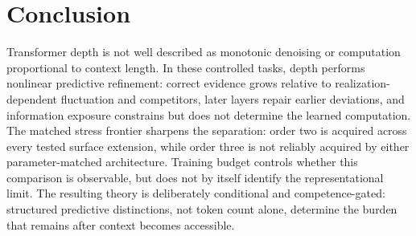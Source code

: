 \documentclass[10pt]{article}
\begin{document}
\section{Conclusion}
Transformer depth is not well described as monotonic denoising or computation proportional to context length. In these controlled tasks, depth performs nonlinear predictive refinement: correct evidence grows relative to realization-dependent fluctuation and competitors, later layers repair earlier deviations, and information exposure constrains but does not determine the learned computation. The matched stress frontier sharpens the separation: order two is acquired across every tested surface extension, while order three is not reliably acquired by either parameter-matched architecture. Training budget controls whether this comparison is observable, but does not by itself identify the representational limit. The resulting theory is deliberately conditional and competence-gated: structured predictive distinctions, not token count alone, determine the burden that remains after context becomes accessible.

\appendix

\end{document}
